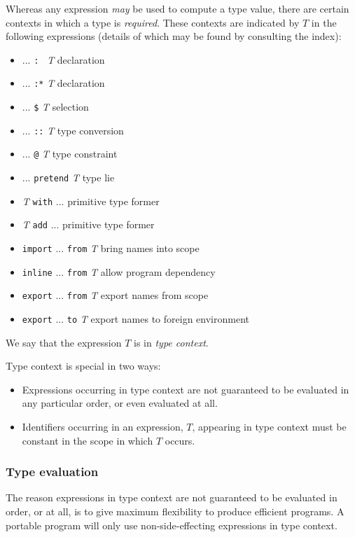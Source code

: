 Whereas any expression {\em may\/} be used to compute a type value,
there are certain contexts in which a type is {\em required\/}.
These contexts are indicated by $T$ in the following expressions
(details of which may be found by consulting the index):
\begin{itemize}
\item ... \verb": "      {\em T} \hfill declaration
\item ... \verb":*"      {\em T} \hfill declaration
\item ... \verb"$"       {\em T} \hfill selection
\item ... \verb"::"      {\em T} \hfill type conversion
\item ... \verb"@"       {\em T} \hfill type constraint
\item ... \verb"pretend" {\em T} \hfill type lie
\item {\em T} \verb"with" ...    \hfill primitive type former
\item {\em T} \verb"add" ...     \hfill primitive type former
\item \verb"import" ... \verb"from" {\em T} \hfill bring names into scope
\item \verb"inline" ... \verb"from" {\em T} \hfill allow program dependency
\item \verb"export" ... \verb"from" {\em T} \hfill export names from scope
\item \verb"export" ... \verb"to"   {\em T} \hfill export names to foreign environment
\end{itemize}
We say that the expression $T$ is in {\em type context\/}.

Type context is special in two ways:
\begin{itemize}
\item 
Expressions occurring in type context are not guaranteed to be evaluated
in any particular order, or even evaluated at all.

\item
Identifiers occurring in an expression, $T$, appearing in type context
must be constant in the scope in which $T$ occurs.
\end{itemize}

\subsubsection{Type evaluation}

The reason expressions in type context are not guaranteed to be
evaluated in order, or at all, is to give maximum flexibility to produce
efficient programs. 
A portable program will only use non-side-effecting
expressions in type context.

